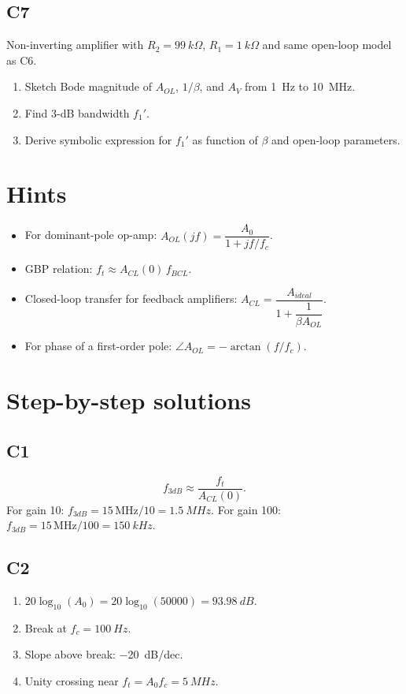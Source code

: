 \documentclass[12pt,a4paper]{article}
\begin{document}
\subsection{C7}
Non-inverting amplifier with $R_2=\SI{99}{k\Omega}$, $R_1=\SI{1}{k\Omega}$ and same open-loop model as C6.
\begin{enumerate}
\item Sketch Bode magnitude of $A_{OL}$, $1/\beta$, and $A_V$ from \SI{1}{Hz} to \SI{10}{MHz}.
\item Find 3-dB bandwidth $f_1'$.
\item Derive symbolic expression for $f_1'$ as function of $\beta$ and open-loop parameters.
\end{enumerate}

\section{Hints}
\begin{itemize}
\item For dominant-pole op-amp: $A_{OL}(j f)=\dfrac{A_0}{1+j f/f_c}$.
\item GBP relation: $f_t\approx A_{CL}(0)\,f_{BCL}$.
\item Closed-loop transfer for feedback amplifiers: 
$A_{CL}=\dfrac{A_{ideal}}{1+\dfrac{1}{\beta A_{OL}}}$.
\item For phase of a first-order pole: $\angle A_{OL}=-\arctan(f/f_c)$.
\end{itemize}

\section{Step-by-step solutions}
\subsection{C1}
\[
f_{3dB}\approx \frac{f_t}{A_{CL}(0)}.
\]
For gain 10: $f_{3dB}=15\,\text{MHz}/10=\SI{1.5}{MHz}$.
For gain 100: $f_{3dB}=15\,\text{MHz}/100=\SI{150}{kHz}$.

\subsection{C2}
\begin{enumerate}
\item $20\log_{10}(A_0)=20\log_{10}(50000)=\SI{93.98}{dB}$.
\item Break at $f_c=\SI{100}{Hz}$.
\item Slope above break: \SI{-20}{dB/dec}.
\item Unity crossing near $f_t=A_0f_c=\SI{5}{MHz}$.
\end{enumerate}
\end{document}

